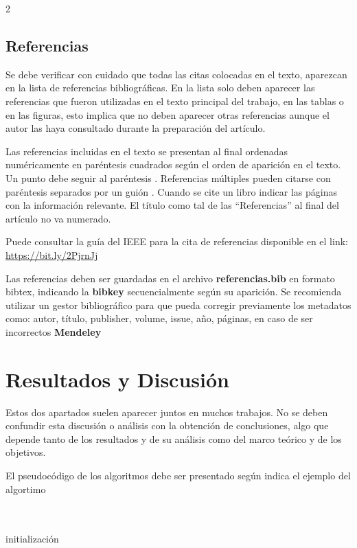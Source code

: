 \documentclass[12pt,twoside,titlepage]{ingenius}
\begin{document}
\begin{multicols}{2}
\subsection{Referencias}

Se debe verificar con cuidado que todas las citas colocadas en el texto, aparezcan en la lista de referencias bibliográficas. En la lista solo deben aparecer las referencias que fueron utilizadas en el texto principal del trabajo, en las tablas o en las figuras, esto implica que no deben aparecer otras referencias aunque el autor las haya consultado durante la preparación del artículo.

        Las referencias incluidas en el texto se presentan al final ordenadas numéricamente en paréntesis cuadrados \cite{Valenzuela2019} según el orden de aparición en el texto. Un punto debe seguir al paréntesis \cite{Panwar2019}. Referencias múltiples pueden citarse con paréntesis separados por un guión \cite{Ramirez2015,Pagani2014,Peralta2017}. Cuando se cite un libro indicar las páginas con la información relevante. El título como tal de las “Referencias” al final del artículo no va numerado.
        
Puede consultar la guía del IEEE para la cita de referencias disponible en el link: \url{https://bit.ly/2PjrnJj}

Las referencias deben ser guardadas en el archivo \textbf{referencias.bib} en formato bibtex, indicando la \textbf{bibkey} secuencialmente según su aparición. Se recomienda utilizar un gestor bibliográfico para que pueda corregir previamente los metadatos como: autor, título, publisher, volume, issue, año, páginas, en caso de ser incorrectos \textbf{Mendeley}

\section{Resultados y Discusión}

Estos dos apartados suelen aparecer juntos en muchos trabajos. No se deben confundir esta discusión o análisis con la obtención de conclusiones, algo que depende tanto de los resultados y de su análisis como del marco teórico y de los objetivos.

El pseudocódigo de los algoritmos debe ser presentado según indica el ejemplo del algortimo

\begin{algorithm}[H]
\label{algo1}
\SetAlgoLined
{} \\
 \\
 initialización\;
 \caption{Como escribir algoritmos}
\end{algorithm}






\end{multicols}
\end{document}
